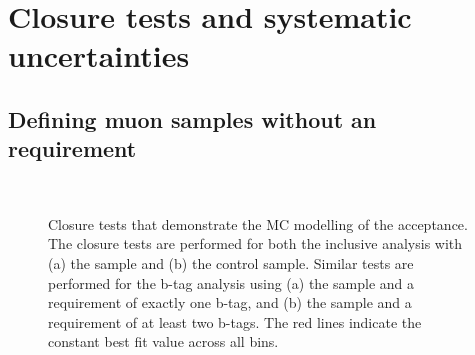 \chapter{Closure tests and systematic uncertainties}
\label{sec:Closure_tests_and_systematic_uncertainties}
\section{Defining muon samples without an \texorpdfstring{\alt}{alphaT} requirement}
\label{app:control-noalphat}


\begin{figure}[h!]
  \begin{center}
     \\
    \caption{Closure tests that demonstrate the MC modelling of the
      \alt acceptance. The closure tests are performed for both the
      inclusive analysis with (a) the \mj sample and (b) the \mmj
      control sample. Similar tests are performed for the b-tag
      analysis using (a) the \mj sample and a requirement of exactly
      one b-tag, and (b) the \mj sample and a requirement of at least
      two b-tags. The red lines indicate the constant best fit value
      across all \HT bins.\label{fig:closure-with-alphat1}}
  \end{center}
\end{figure}

